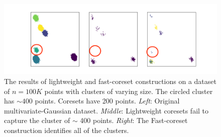 \begin{figure}
\centering
\hspace*{-0.1cm}
\includegraphics[trim={4cm 0 0 0},clip,width=1.13\linewidth]{images/lightweight_breaks.png}
\caption{
The results of lightweight and fast-coreset constructions on a dataset of $n=100K$ points with clusters of varying size. The circled cluster has $\sim 400$ points. Coresets have 200 points.
\emph{Left}: Original multivariate-Gaussian dataset. \emph{Middle}: Lightweight coresets fail to capture the cluster of $\sim$ 400 points.
\emph{Right}: The Fast-coreset construction identifies all of the clusters.
}
\label{fig:lightweight_breaks}
\end{figure}
